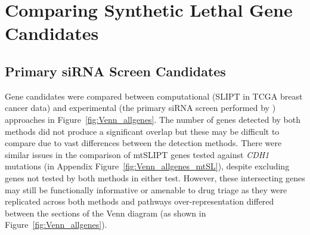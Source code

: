 

\FloatBarrier

\section{Comparing Synthetic Lethal Gene Candidates} \label{chapt3:compare_SL_genes}  



\subsection{Primary siRNA Screen Candidates} \label{chapt3:primary_screen}

Gene candidates were compared between computational (\gls{SLIPT} in \gls{TCGA} breast cancer data) and experimental (the primary \gls{siRNA} screen performed by \citet{Telford2015}) approaches in Figure~\ref{fig:Venn_allgenes}. The number of genes detected by both methods did not produce a significant overlap but these may be difficult to compare due to vast differences between the detection methods. There were similar issues in the comparison of \acrshort{mtSLIPT} genes tested against \textit{CDH1} \glspl{mutation} (in Appendix Figure~\ref{fig:Venn_allgenes_mtSL}), despite excluding genes not tested by both methods in either test. However, these intersecting genes may still be functionally informative or amenable to drug triage as they were replicated across both methods and \glspl{pathway} over-represent\-ation differed between the sections of the Venn diagram (as shown in Figure~\ref{fig:Venn_allgenes}).

